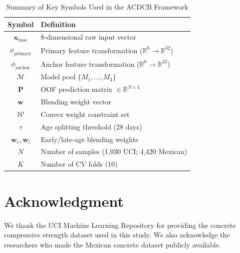 \documentclass[journal]{IEEEtran}
\begin{document}
\begin{table}[h]
\renewcommand{\arraystretch}{1.3}
\caption{Summary of Key Symbols Used in the ACDCB Framework}
\label{tab:nomenclature}
\centering
\begin{tabular}{cl}
\toprule
\textbf{Symbol} & \textbf{Definition} \\
\midrule
$\mathbf{x}_{\text{base}}$ & 8-dimensional raw input vector \\
$\phi_{\text{primary}}$    & Primary feature transformation ($\mathbb{R}^8 \to \mathbb{R}^{32}$) \\
$\phi_{\text{anchor}}$     & Anchor feature transformation ($\mathbb{R}^8 \to \mathbb{R}^{22}$) \\
$\mathcal{M}$              & Model pool $\{M_1, \dots, M_4\}$ \\
$\mathbf{P}$               & OOF prediction matrix $\in \mathbb{R}^{N \times 4}$ \\
$\mathbf{w}$               & Blending weight vector \\
$\mathcal{W}$             & Convex weight constraint set \\
$\tau$                     & Age splitting threshold (28 days) \\
$\mathbf{w}_e, \mathbf{w}_l$ & Early/late-age blending weights \\
$N$                        & Number of samples (1{,}030 UCI; 4{,}420 Mexican) \\
$K$                        & Number of CV folds (10) \\
\bottomrule
\end{tabular}
\end{table}

\section*{Acknowledgment}
We thank the UCI Machine Learning Repository for providing the concrete compressive strength dataset used in this study. We also acknowledge the researchers who made the Mexican concrete dataset publicly available.





\end{document}
